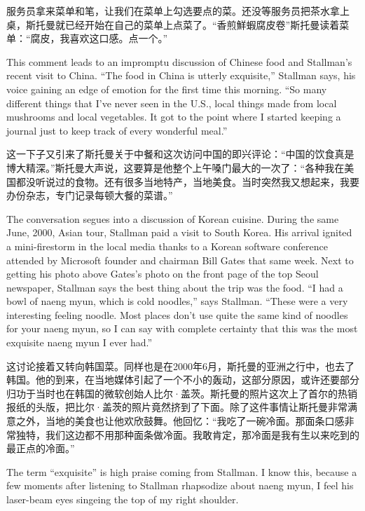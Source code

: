 \ifdefined\chs
服务员拿来菜单和笔，让我们在菜单上勾选要点的菜。还没等服务员把茶水拿上桌，斯托曼就已经开始在自己的菜单上点菜了。``香煎鮮蝦腐皮卷''斯托曼读着菜单：``腐皮，我喜欢这口感。点一个。''
\fi

\ifdefined\eng
This comment leads to an impromptu discussion of Chinese food and Stallman's recent visit to China. ``The food in China is utterly exquisite,'' Stallman says, his voice gaining an edge of emotion for the first time this morning. ``So many different things that I've never seen in the U.S., local things made from local mushrooms and local vegetables. It got to the point where I started keeping a journal just to keep track of every wonderful meal.''
\fi

\ifdefined\chs
这一下子又引来了斯托曼关于中餐和这次访问中国的即兴评论：``中国的饮食真是博大精深。''斯托曼大声说，这要算是他整个上午嗓门最大的一次了：``各种我在美国都没听说过的食物。还有很多当地特产，当地美食。当时突然我又想起来，我要办份杂志，专门记录每顿大餐的菜谱。''
\fi

\ifdefined\eng
The conversation segues into a discussion of Korean cuisine. During the same June, 2000, Asian tour, Stallman paid a visit to South Korea. His arrival ignited a mini-firestorm in the local media thanks to a Korean software conference attended by Microsoft founder and chairman Bill Gates that same week. Next to getting his photo above Gates's photo on the front page of the top Seoul newspaper, Stallman says the best thing about the trip was the food. ``I had a bowl of naeng myun, which is cold noodles,'' says Stallman. ``These were a very interesting feeling noodle. Most places don't use quite the same kind of noodles for your naeng myun, so I can say with complete certainty that this was the most exquisite naeng myun I ever had.''
\fi

\ifdefined\chs
这讨论接着又转向韩国菜。同样也是在2000年6月，斯托曼的亚洲之行中，也去了韩国。他的到来，在当地媒体引起了一个不小的轰动，这部分原因，或许还要部分归功于当时也在韩国的微软创始人比尔·盖茨。斯托曼的照片这次上了首尔的热销报纸的头版，把比尔·盖茨的照片竟然挤到了下面。除了这件事情让斯托曼非常满意之外，当地的美食也让他欢欣鼓舞。他回忆：``我吃了一碗冷面。那面条口感非常独特，我们这边都不用那种面条做冷面。我敢肯定，那冷面是我有生以来吃到的最正点的冷面。''
\fi

\ifdefined\eng
The term ``exquisite'' is high praise coming from Stallman. I know this, because a few moments after listening to Stallman rhapsodize about naeng myun, I feel his laser-beam eyes singeing the top of my right shoulder.
\fi

